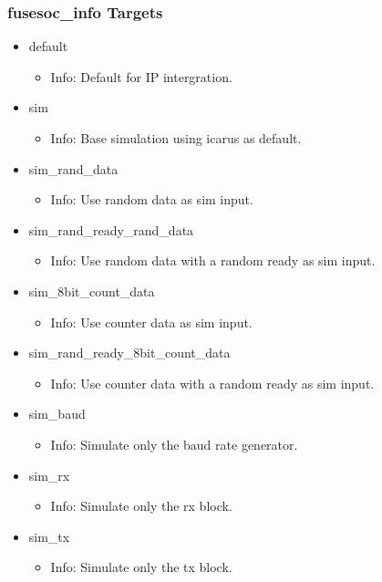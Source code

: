 \subsubsection{fusesoc\_info Targets}
\begin{itemize}
\item default
	\begin{itemize}
	\item[$\space$] Info: Default for IP intergration.
	\end{itemize}
\item sim
	\begin{itemize}
	\item[$\space$] Info: Base simulation using icarus as default.
	\end{itemize}
\item sim\_rand\_data
	\begin{itemize}
	\item[$\space$] Info: Use random data as sim input.
	\end{itemize}
\item sim\_rand\_ready\_rand\_data
	\begin{itemize}
	\item[$\space$] Info: Use random data with a random ready as sim input.
	\end{itemize}
\item sim\_8bit\_count\_data
	\begin{itemize}
	\item[$\space$] Info: Use counter data as sim input.
	\end{itemize}
\item sim\_rand\_ready\_8bit\_count\_data
	\begin{itemize}
	\item[$\space$] Info: Use counter data with a random ready as sim input.
	\end{itemize}
\item sim\_baud
	\begin{itemize}
	\item[$\space$] Info: Simulate only the baud rate generator.
	\end{itemize}
\item sim\_rx
	\begin{itemize}
	\item[$\space$] Info: Simulate only the rx block.
	\end{itemize}
\item sim\_tx
	\begin{itemize}
	\item[$\space$] Info: Simulate only the tx block.
	\end{itemize}
\end{itemize}
